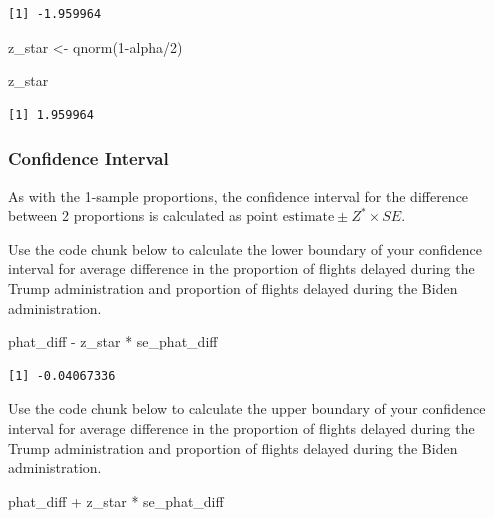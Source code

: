 \documentclass[
  letterpaper,
  DIV=11,
  numbers=noendperiod]{scrartcl}
\newenvironment{Shaded}{\begin{snugshade}}{\end{snugshade}}
\newcommand{\DecValTok}[1]{\textcolor[rgb]{0.68,0.00,0.00}{#1}}
\newcommand{\FunctionTok}[1]{\textcolor[rgb]{0.28,0.35,0.67}{#1}}
\newcommand{\NormalTok}[1]{\textcolor[rgb]{0.00,0.23,0.31}{#1}}
\newcommand{\OtherTok}[1]{\textcolor[rgb]{0.00,0.23,0.31}{#1}}
\newcommand{\SpecialCharTok}[1]{\textcolor[rgb]{0.37,0.37,0.37}{#1}}
\begin{document}
\begin{verbatim}
[1] -1.959964
\end{verbatim}

\begin{Shaded}
\begin{Highlighting}[]
\NormalTok{z\_star }\OtherTok{\textless{}{-}} \FunctionTok{qnorm}\NormalTok{(}\DecValTok{1}\SpecialCharTok{{-}}\NormalTok{alpha}\SpecialCharTok{/}\DecValTok{2}\NormalTok{)}

\NormalTok{z\_star}
\end{Highlighting}
\end{Shaded}

\begin{verbatim}
[1] 1.959964
\end{verbatim}

\subsubsection{Confidence Interval}\label{confidence-interval-1}

As with the 1-sample proportions, the confidence interval for the
difference between 2 proportions is calculated as
\(\text{point estimate} \pm Z^* \times SE\).

Use the code chunk below to calculate the lower boundary of your
confidence interval for average difference in the proportion of flights
delayed during the Trump administration and proportion of flights
delayed during the Biden administration.

\begin{Shaded}
\begin{Highlighting}[]
\NormalTok{phat\_diff }\SpecialCharTok{{-}}\NormalTok{ z\_star }\SpecialCharTok{*}\NormalTok{ se\_phat\_diff}
\end{Highlighting}
\end{Shaded}

\begin{verbatim}
[1] -0.04067336
\end{verbatim}

Use the code chunk below to calculate the upper boundary of your
confidence interval for average difference in the proportion of flights
delayed during the Trump administration and proportion of flights
delayed during the Biden administration.

\begin{Shaded}
\begin{Highlighting}[]
\NormalTok{phat\_diff }\SpecialCharTok{+}\NormalTok{ z\_star }\SpecialCharTok{*}\NormalTok{ se\_phat\_diff}
\end{Highlighting}
\end{Shaded}
\end{document}

